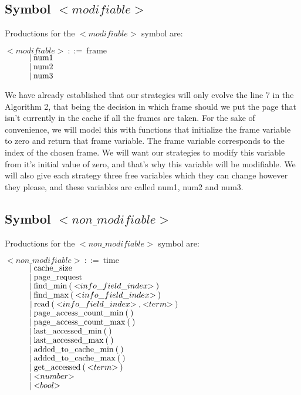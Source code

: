 \subsection{Symbol ${<}modifiable{>}$}
Productions for the ${<}modifiable{>}$ symbol are:

\noindent
$ {<}modifiable{>}\:::=\:\text{frame} $\\
$ \indent\indent |\:\text{num1} $\\
$ \indent\indent |\:\text{num2} $\\
$ \indent\indent |\:\text{num3} $

We have already established that our strategies will only evolve the line 7 in the Algorithm 2, that being the decision in which frame should we put the page that isn't currently in the cache if all the frames are taken. For the sake of convenience, we will model this with functions that initialize the frame variable to zero and return that frame variable. The frame variable corresponds to the index of the chosen frame. We will want our strategies to modify this variable from it's initial value of zero, and that's why this variable will be modifiable. We will also give each strategy three free variables which they can change however they please, and these variables are called num1, num2 and num3.

\subsection{Symbol ${<}non\_modifiable{>}$}
Productions for the ${<}non\_modifiable{>}$ symbol are:

\noindent
$ {<}non\_modifiable{>}\:::=\:\text{time} $\\
$ \indent\indent |\:\text{cache\_size} $\\
$ \indent\indent |\:\text{page\_request} $\\
$ \indent\indent |\:\text{find\_min}\:\text{(}\:{<}info\_field\_index{>}\:\text{)} $\\
$ \indent\indent |\:\text{find\_max}\:\text{(}\:{<}info\_field\_index{>}\:\text{)} $\\
$ \indent\indent |\:\text{read}\:\text{(}\:{<}info\_field\_index{>}\:\text{,}\:{<}term{>}\:\text{)} $\\
$ \indent\indent |\:\text{page\_access\_count\_min}\:\text{(}\:\text{)}$\\
$ \indent\indent |\:\text{page\_access\_count\_max}\:\text{(}\:\text{)}$\\
$ \indent\indent |\:\text{last\_accessed\_min}\:\text{(}\:\text{)}$\\
$ \indent\indent |\:\text{last\_accessed\_max}\:\text{(}\:\text{)}$\\
$ \indent\indent |\:\text{added\_to\_cache\_min}\:\text{(}\:\text{)}$\\
$ \indent\indent |\:\text{added\_to\_cache\_max}\:\text{(}\:\text{)}$\\
$ \indent\indent |\:\text{get\_accessed}\:\text{(}\:{<}term{>}\:\text{)}$\\
$ \indent\indent |\:{<}number{>} $\\
$ \indent\indent |\:{<}bool{>} $

